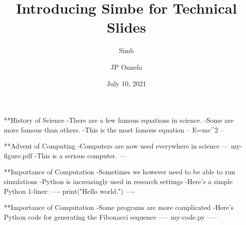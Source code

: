 
\title[SimBe]{Introducing Simbe for Technical Slides}
\subtitle{Simb}
\author[JP Onnela]{JP Onnela}
\date[July 10, 2021]{July 10, 2021}
\frame{\titlepage}

**History of Science
-There are a few famous equations in science.
  -Some are more famous than others.
-This is the most famous equation
--
E=mc^2
--

**Advent of Computing
-Computers are now used everywhere in science
---
my-figure.pdf
-This is a serious computer.
---

**Importance of Computation
-Sometimes we however need to be able to run simulations
-Python is increasingly used in research settings
-Here's a simple Python 1-liner:
----
print("Hello world.")
----

**Importance of Computation
-Some programs are more complicated
-Here's Python code for generating the Fibonacci sequence
-----
my-code.py
-----

